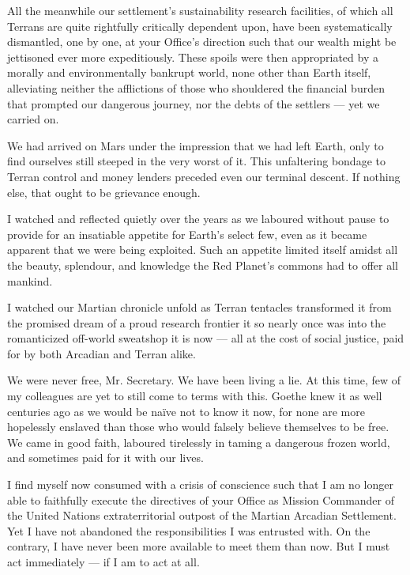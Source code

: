 All the meanwhile our settlement's sustainability research facilities, of which all Terrans are quite rightfully critically dependent upon, have been systematically dismantled, one by one, at your Office's direction such that our wealth might be jettisoned ever more expeditiously. These spoils were then appropriated by a morally and environmentally bankrupt world, none other than Earth itself, alleviating neither the afflictions of those who shouldered the financial burden that prompted our dangerous journey, nor the debts of the settlers — yet we carried on.

We had arrived on Mars under the impression that we had left Earth, only to find ourselves still steeped in the very worst of it. This unfaltering bondage to Terran control and money lenders preceded even our terminal descent. If nothing else, that ought to be grievance enough.

I watched and reflected quietly over the years as we laboured without pause to provide for an insatiable appetite for Earth's select few, even as it became apparent that we were being exploited. Such an appetite limited itself amidst all the beauty, splendour, and knowledge the Red Planet's commons had to offer all mankind.

I watched our Martian chronicle unfold as Terran tentacles transformed it from the promised dream of a proud research frontier it so nearly once was into the romanticized off-world sweatshop it is now — all at the cost of social justice, paid for by both Arcadian and Terran alike.

We were never free, Mr. Secretary. We have been living a lie. At this time, few of my colleagues are yet to still come to terms with this. Goethe knew it as well centuries ago as we would be naïve not to know it now, for none are more hopelessly enslaved than those who would falsely believe themselves to be free. We came in good faith, laboured tirelessly in taming a dangerous frozen world, and sometimes paid for it with our lives.

I find myself now consumed with a crisis of conscience such that I am no longer able to faithfully execute the directives of your Office as Mission Commander of the United Nations extraterritorial outpost of the Martian Arcadian Settlement. Yet I have not abandoned the responsibilities I was entrusted with. On the contrary, I have never been more available to meet them than now. But I must act immediately — if I am to act at all. 

